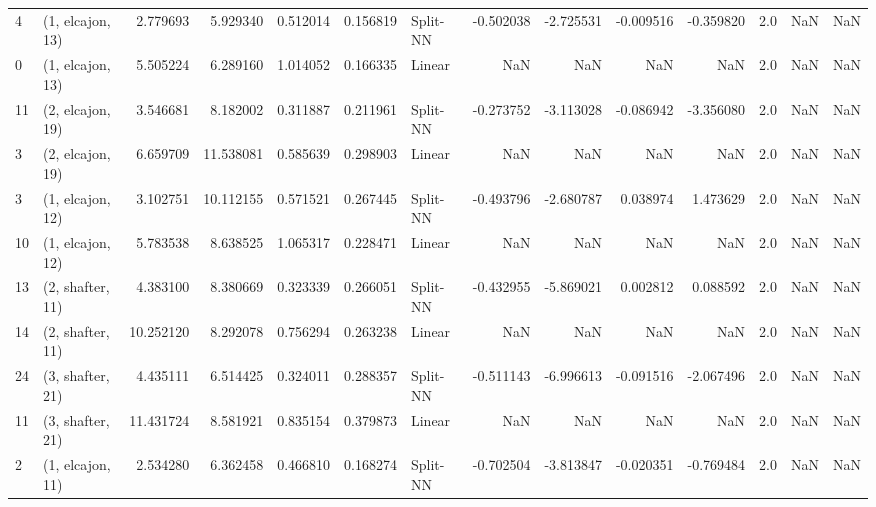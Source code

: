 \begin{tabular}{llrrrrlrrrrrrl}
4  &  (1, elcajon, 13) &   2.779693 &   5.929340 &   0.512014 &  0.156819 &    Split-NN &       -0.502038 &     -2.725531 &      -0.009516 &    -0.359820 &            2.0 &    NaN &              NaN \\
0  &  (1, elcajon, 13) &   5.505224 &   6.289160 &   1.014052 &  0.166335 &      Linear &             NaN &           NaN &            NaN &          NaN &            2.0 &    NaN &              NaN \\
11 &  (2, elcajon, 19) &   3.546681 &   8.182002 &   0.311887 &  0.211961 &    Split-NN &       -0.273752 &     -3.113028 &      -0.086942 &    -3.356080 &            2.0 &    NaN &              NaN \\
3  &  (2, elcajon, 19) &   6.659709 &  11.538081 &   0.585639 &  0.298903 &      Linear &             NaN &           NaN &            NaN &          NaN &            2.0 &    NaN &              NaN \\
3  &  (1, elcajon, 12) &   3.102751 &  10.112155 &   0.571521 &  0.267445 &    Split-NN &       -0.493796 &     -2.680787 &       0.038974 &     1.473629 &            2.0 &    NaN &              NaN \\
10 &  (1, elcajon, 12) &   5.783538 &   8.638525 &   1.065317 &  0.228471 &      Linear &             NaN &           NaN &            NaN &          NaN &            2.0 &    NaN &              NaN \\
13 &  (2, shafter, 11) &   4.383100 &   8.380669 &   0.323339 &  0.266051 &    Split-NN &       -0.432955 &     -5.869021 &       0.002812 &     0.088592 &            2.0 &    NaN &              NaN \\
14 &  (2, shafter, 11) &  10.252120 &   8.292078 &   0.756294 &  0.263238 &      Linear &             NaN &           NaN &            NaN &          NaN &            2.0 &    NaN &              NaN \\
24 &  (3, shafter, 21) &   4.435111 &   6.514425 &   0.324011 &  0.288357 &    Split-NN &       -0.511143 &     -6.996613 &      -0.091516 &    -2.067496 &            2.0 &    NaN &              NaN \\
11 &  (3, shafter, 21) &  11.431724 &   8.581921 &   0.835154 &  0.379873 &      Linear &             NaN &           NaN &            NaN &          NaN &            2.0 &    NaN &              NaN \\
2  &  (1, elcajon, 11) &   2.534280 &   6.362458 &   0.466810 &  0.168274 &    Split-NN &       -0.702504 &     -3.813847 &      -0.020351 &    -0.769484 &            2.0 &    NaN &              NaN \\

\end{tabular}
